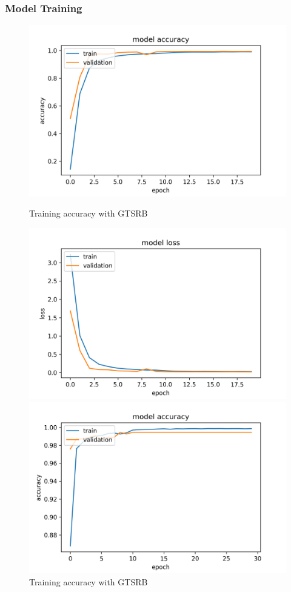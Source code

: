\documentclass{article}
\begin{document}
\subsubsection{Model Training}
\begin{figure}
  \centering
  \begin{minipage}{.42\textwidth}
    \centering
    \includegraphics[width=0.95\linewidth]{acc_f.png}
    \caption{Training accuracy with GTSRB}
    \label{fig:fig_6}
  \end{minipage}
  \begin{minipage}{.42\textwidth}
    \includegraphics[width=0.95\linewidth]{loss_f.png}
    \centering
    \caption{Training accuracy with GTSRB}
    \label{fig:fig_7}
  \end{minipage}
  \centering
  \begin{minipage}{.42\textwidth}
  	\centering
    \includegraphics[width=0.95\linewidth]{model_accuracy.png}

\end{minipage}
\end{figure}
\end{document}
